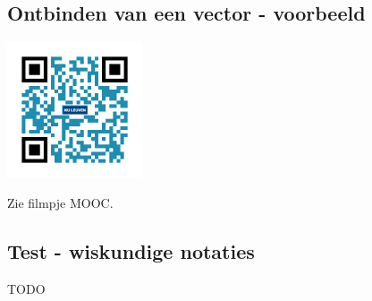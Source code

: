 \subsection{Ontbinden van een vector - voorbeeld}
\begin{minipage}{.25\linewidth}
	\raggedright
	\includegraphics[width=4cm]{1_elem_rekenvaardigheden_A/inputs/QR_Code_ONTBINDEN_module_1}
\end{minipage}
\begin{minipage}{.7\linewidth}
	Zie filmpje MOOC.
\end{minipage}

\subsection{Test - wiskundige notaties}
TODO